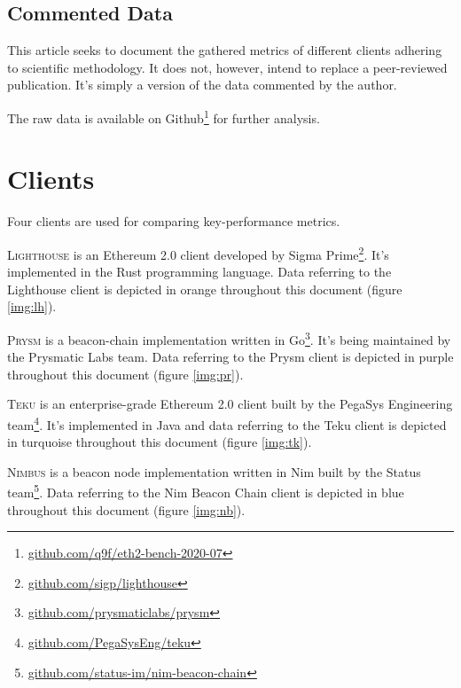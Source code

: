\documentclass[twoside,twocolumn]{article}
\begin{document}
\subsection{Commented Data}
This article seeks to document the gathered metrics of different clients adhering to scientific methodology. It does not, however, intend to replace a peer-reviewed publication. It's simply a version of the data commented by the author.\par

The raw data is available on Github\footnote{\href{https://github.com/q9f/eth2-bench-2020-07}{github.com/q9f/eth2-bench-2020-07}} for further analysis.

\section{Clients}
\label{sec:cli}

Four clients are used for comparing key-performance metrics.\par

\textsc{Lighthouse} is an Ethereum 2.0 client developed by Sigma Prime\footnote{\href{https://github.com/sigp/lighthouse}{github.com/sigp/lighthouse}}. It's implemented in the Rust programming language. Data referring to the Lighthouse client is depicted in orange throughout this document (figure \ref{img:lh}).\par

\textsc{Prysm} is a beacon-chain implementation written in Go\footnote{\href{https://github.com/prysmaticlabs/prysm}{github.com/prysmaticlabs/prysm}}. It's being maintained by the Prysmatic Labs team. Data referring to the Prysm client is depicted in purple throughout this document (figure \ref{img:pr}).\par

\textsc{Teku} is an enterprise-grade Ethereum 2.0 client built by the PegaSys Engineering team\footnote{\href{https://github.com/PegaSysEng/teku}{github.com/PegaSysEng/teku}}. It's implemented in Java and data referring to the Teku client is depicted in turquoise throughout this document (figure \ref{img:tk}).\par

\textsc{Nimbus} is a beacon node implementation written in Nim built by the Status team\footnote{\href{https://github.com/status-im/nim-beacon-chain}{github.com/status-im/nim-beacon-chain}}. Data referring to the Nim Beacon Chain client is depicted in blue throughout this document (figure \ref{img:nb}).\par
\end{document}
